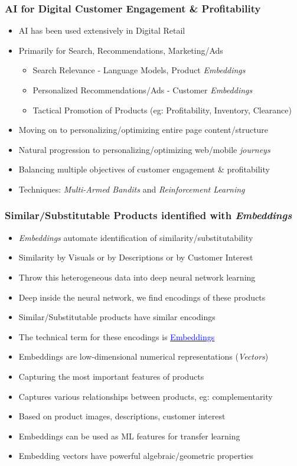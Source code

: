 \documentclass[handout]{beamer}
\begin{document}
\begin{frame}
\frametitle{AI for Digital Customer Engagement \& Profitability}
\pause
\begin{itemize}[<+->]
\item AI has been used extensively in Digital Retail
\item Primarily for Search, Recommendations, Marketing/Ads
\begin{itemize}
\item Search Relevance - Language Models, Product  {\em Embeddings}
\item Personalized Recommendations/Ads - Customer  {\em Embeddings}
\item Tactical Promotion of Products (eg: Profitability, Inventory, Clearance)
\end{itemize}
\item Moving on to personalizing/optimizing entire page content/structure
\item Natural progression to personalizing/optimizing web/mobile {\em journeys}
\item Balancing multiple objectives of customer engagement \& profitability
\item Techniques: {\em Multi-Armed Bandits} and {\em Reinforcement Learning}
\end{itemize}
\end{frame}


\begin{frame}
\frametitle{Similar/Substitutable Products identified with {\em Embeddings}}
\pause
\begin{itemize}[<+->]
\item {\em Embeddings} automate identification of similarity/substitutability
\item Similarity by Visuals or by Descriptions or by Customer Interest
\item Throw this heterogeneous data into deep neural network learning
\item Deep inside the neural network, we find encodings of these products
\item Similar/Substitutable products have similar encodings
\item The technical term for these encodings is \href{https://developers.google.com/machine-learning/crash-course/embeddings/video-lecture}{\underline{\textcolor{blue}{Embeddings}}}
\item Embeddings are low-dimensional numerical representations ({\em Vectors})
\item Capturing the most important features of products
\item Captures various relationships between products, eg: complementarity
\item Based on product images, descriptions, customer interest
\item Embeddings can be used as ML features for transfer learning
\item Embedding vectors have powerful algebraic/geometric properties
\end{itemize}
\end{frame}
\end{document}
